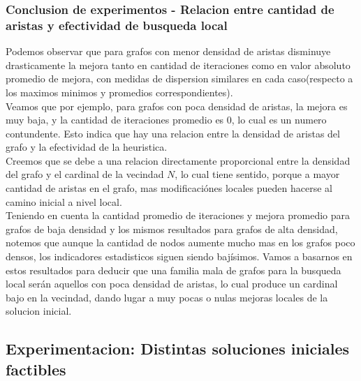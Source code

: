 \subsubsection{Conclusion de experimentos - Relacion entre cantidad de aristas y efectividad de busqueda local}
Podemos observar que para grafos con menor densidad de aristas disminuye drasticamente la mejora tanto en cantidad de iteraciones como en valor absoluto promedio de mejora, con medidas de dispersion similares en cada caso(respecto a los maximos minimos y promedios correspondientes).\\
 Veamos que por ejemplo, para grafos con poca densidad de aristas, la mejora es muy baja, y la cantidad de iteraciones promedio es 0, lo cual es un numero contundente. Esto indica que hay una relacion entre la densidad de aristas del grafo y la efectividad de la heuristica.\\
 Creemos que se debe a una relacion directamente proporcional entre la densidad del grafo y el cardinal de la vecindad $N$, lo cual tiene sentido, porque a mayor cantidad de aristas en el grafo, mas modificaci\'ones locales pueden hacerse al camino inicial a nivel local.\\
Teniendo en cuenta la cantidad promedio de iteraciones y mejora promedio para grafos de baja densidad y los mismos resultados para grafos de alta densidad, notemos que aunque la cantidad de nodos aumente mucho mas en los grafos poco densos, los indicadores estadisticos siguen siendo baj\'isimos. Vamos a basarnos en estos resultados para deducir que una familia mala de grafos para la busqueda local ser\'an aquellos con poca densidad de aristas, lo cual produce un cardinal bajo en la vecindad, dando lugar a muy pocas o nulas mejoras locales de la solucion inicial.

\subsection{Experimentacion: Distintas soluciones iniciales factibles}
